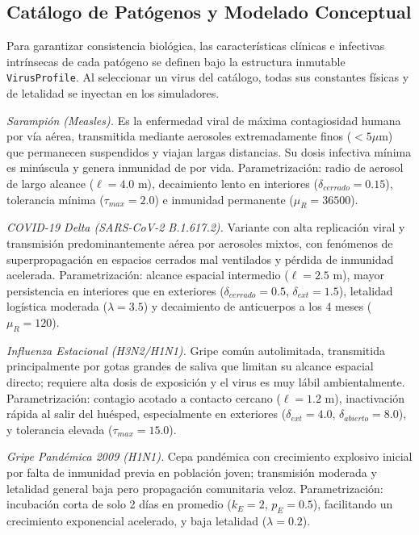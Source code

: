 \documentclass[conference]{IEEEtran}
\begin{document}
\subsection{Catálogo de Patógenos y Modelado Conceptual}
Para garantizar consistencia biológica, las características clínicas e infectivas intrínsecas de cada patógeno se definen bajo la estructura inmutable \texttt{VirusProfile}. Al seleccionar un virus del catálogo, todas sus constantes físicas y de letalidad se inyectan en los simuladores.

\textit{Sarampión (Measles).} Es la enfermedad viral de máxima contagiosidad humana por vía aérea, transmitida mediante aerosoles extremadamente finos ($<5\mu$m) que permanecen suspendidos y viajan largas distancias. Su dosis infectiva mínima es minúscula y genera inmunidad de por vida. Parametrización: radio de aerosol de largo alcance ($\ell=4.0$ m), decaimiento lento en interiores ($\delta_{cerrado}=0.15$), tolerancia mínima ($\tau_{max}=2.0$) e inmunidad permanente ($\mu_R=36500$).

\textit{COVID-19 Delta (SARS-CoV-2 B.1.617.2).} Variante con alta replicación viral y transmisión predominantemente aérea por aerosoles mixtos, con fenómenos de superpropagación en espacios cerrados mal ventilados y pérdida de inmunidad acelerada. Parametrización: alcance espacial intermedio ($\ell=2.5$ m), mayor persistencia en interiores que en exteriores ($\delta_{cerrado}=0.5$, $\delta_{ext}=1.5$), letalidad logística moderada ($\lambda=3.5$) y decaimiento de anticuerpos a los 4 meses ($\mu_R=120$).

\textit{Influenza Estacional (H3N2/H1N1).} Gripe común autolimitada, transmitida principalmente por gotas grandes de saliva que limitan su alcance espacial directo; requiere alta dosis de exposición y el virus es muy lábil ambientalmente. Parametrización: contagio acotado a contacto cercano ($\ell=1.2$ m), inactivación rápida al salir del huésped, especialmente en exteriores ($\delta_{ext}=4.0$, $\delta_{abierto}=8.0$), y tolerancia elevada ($\tau_{max}=15.0$).

\textit{Gripe Pandémica 2009 (H1N1).} Cepa pandémica con crecimiento explosivo inicial por falta de inmunidad previa en población joven; transmisión moderada y letalidad general baja pero propagación comunitaria veloz. Parametrización: incubación corta de solo 2 días en promedio ($k_E=2$, $p_E=0.5$), facilitando un crecimiento exponencial acelerado, y baja letalidad ($\lambda=0.2$).
\end{document}
